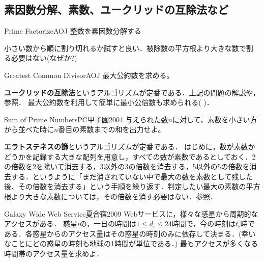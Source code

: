 \begin{versionbeta}

\section{素因数分解、素数、ユークリッドの互除法など}

\begin{psbox}{Prime Factorize}{AOJ}
整数を素因数分解する

\end{psbox}
小さい数から順に割り切れるか試すと良い．被除数の平方根より大きな数で割
る必要はない(なぜか?)

\begin{psbox}{Greatest Common Divisor}{AOJ}
最大公約数を求める。  

\end{psbox}

\textbf{ユークリッドの互除法}というアルゴリズムが定番である．上記の問題の解説や\pcaojbook[pp.~441--443]，\pccbook[pp.~107--]参照．
最大公約数を利用して簡単に最小公倍数も求められる(  )．


\begin{psbox}{Sum of Prime Numbers}{PC甲子園2004}
与えられた数$n$に対して，素数を小さい方から並べた時に$n$番目の素数までの和を出力せよ。

\end{psbox}

\textbf{エラトステネスの篩}というアルゴリズムが定番である．
はじめに，数が素数かどうかを記録する大きな配列を用意し，すべての数が素数であるとしておく．2の倍数を2を除いて消去する，3以外の3の倍数を消去する，5以外の5の倍数を消去する．というように「まだ消されていない中で最大の数を素数として残した後、その倍数を消去する」という手順を繰り返す．判定したい最大の素数の平方根より大きな素数については，その倍数を消す必要はない．\pcaojbook[pp.~438--439]参照．


\begin{pbox}{Galaxy Wide Web Service}{夏合宿2009}
Webサービスに，様々な惑星から周期的なアクセスがある．
惑星$i$の，一日の時間は$1\le d_i \le 24$時間で，今の時刻は$t_i$時である．各惑星からのアクセス量はその惑星の時刻のみに依存して決まる．(幸いなことにどの惑星の時刻も地球の1時間が単位である．)
最もアクセスが多くなる時間帯のアクセス量を求めよ．

\end{pbox}


\end{versionbeta}
